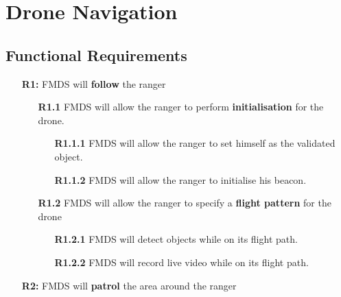 \section{Drone Navigation}

\subsection{Functional Requirements}

	\begin{flushleft}
		\begin{itemize}
			\item [\textbf{R1:}] FMDS will \textbf{follow} the ranger

		  		\begin{itemize}
		  			\item  [\textbf{R1.1}] FMDS will allow the ranger to perform \textbf{initialisation} for the drone.
		  				\begin{itemize}
		  					\item [\textbf{R1.1.1}] FMDS will allow the ranger to set himself as the validated object.
		  					\item [\textbf{R1.1.2}] FMDS will allow the ranger to initialise his beacon. 
		  				\end{itemize}

		  			\item  [\textbf{R1.2}] FMDS will allow the ranger to specify a \textbf{flight pattern} for the drone
		  				\begin{itemize}
		  					\item [\textbf{R1.2.1}] FMDS will detect objects while on its flight path.
		  					\item [\textbf{R1.2.2}] FMDS will record live video while on its flight path.
						  \end{itemize}
			\end{itemize}
		\end{itemize}

		\begin{itemize}
			\item [\textbf{R2:}] FMDS will \textbf{patrol} the area around the ranger


\end{itemize}
\end{flushleft}
